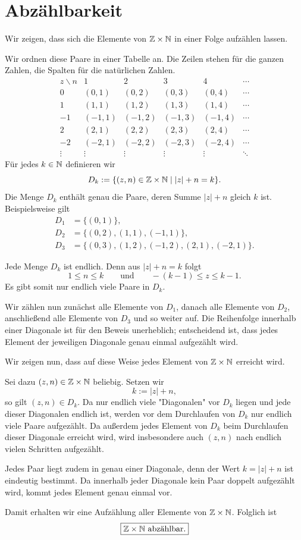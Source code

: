\documentclass{report}
\begin{document}
\section{Abzählbarkeit}



\sol Wir zeigen, dass sich die Elemente von \(\mathbb{Z} \times \mathbb{N}\) in einer Folge aufzählen lassen.

Wir ordnen diese Paare in einer Tabelle an. Die Zeilen stehen für die ganzen Zahlen, die Spalten für die natürlichen Zahlen.
\[
\begin{array}{c|ccccc}
z\backslash n & 1&2&3&4&\cdots\\ \hline
0  &(0,1)&(0,2)&(0,3)&(0,4)&\cdots\\
1  &(1,1)&(1,2)&(1,3)&(1,4)&\cdots\\
-1 &(-1,1)&(-1,2)&(-1,3)&(-1,4)&\cdots\\
2  &(2,1)&(2,2)&(2,3)&(2,4)&\cdots\\
-2 &(-2,1)&(-2,2)&(-2,3)&(-2,4)&\cdots\\
\vdots&\vdots&\vdots&\vdots&\vdots&\ddots
\end{array}
\]
Für jedes \(k\in\mathbb{N}\) definieren wir
\[
D_k:=\{(z,n)\in\mathbb{Z}\times\mathbb{N}\mid |z|+n=k\}.
\]
Die Menge \(D_k\) enthält genau die Paare, deren Summe \(|z|+n\)
gleich \(k\) ist. Beispielsweise gilt
\begin{align*}
D_1&=\{(0,1)\},\\
D_2&=\{(0,2),(1,1),(-1,1)\},\\
D_3&=\{(0,3),(1,2),(-1,2),(2,1),(-2,1)\}.
\end{align*}

Jede Menge \(D_k\) ist endlich. Denn aus \(|z|+n=k\) folgt
\[
1\le n\le k
\qquad\text{und}\qquad
-(k-1)\le z\le k-1.
\]
Es gibt somit nur endlich viele Paare in \(D_k\).

Wir zählen nun zunächst alle Elemente von \(D_1\), danach alle Elemente von \(D_2\), anschließend alle Elemente von \(D_3\) und so weiter auf. Die Reihenfolge innerhalb einer Diagonale ist für den Beweis unerheblich; entscheidend ist, dass jedes Element der jeweiligen Diagonale genau einmal aufgezählt wird.

Wir zeigen nun, dass auf diese Weise jedes Element von
\(\mathbb{Z}\times\mathbb{N}\) erreicht wird.

Sei dazu \((z,n)\in\mathbb{Z}\times\mathbb{N}\) beliebig. Setzen wir
\[
k:=|z|+n,
\]
so gilt \((z,n)\in D_k\). Da nur endlich viele "Diagonalen" vor \(D_k\) liegen und jede dieser Diagonalen endlich ist, werden vor dem Durchlaufen von \(D_k\) nur endlich viele Paare aufgezählt. Da außerdem jedes Element von \(D_k\) beim Durchlaufen dieser Diagonale erreicht wird, wird insbesondere auch \((z,n)\) nach endlich vielen Schritten aufgezählt.

Jedes Paar liegt zudem in genau einer Diagonale, denn der Wert \(k=|z|+n\) ist eindeutig bestimmt. Da innerhalb jeder Diagonale kein Paar doppelt aufgezählt wird, kommt jedes Element genau einmal
vor.

Damit erhalten wir eine Aufzählung aller Elemente von
\(\mathbb{Z}\times\mathbb{N}\). Folglich ist
\[
\boxed{\mathbb{Z}\times\mathbb{N}\text{ abzählbar}.}
\]
\end{document}
